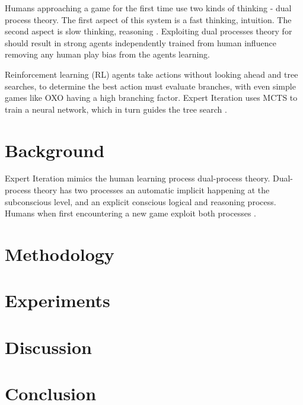 \documentclass[conference]{IEEEtran}
\begin{document}
Humans approaching a game for the first time use two kinds of thinking - dual process theory. The first aspect of this system is a fast thinking, intuition. The second aspect is slow thinking, reasoning \cite{ExpertIteration}. Exploiting dual processes theory for should result in strong agents independently trained from human influence removing any human play bias from the agents learning.

Reinforcement learning (RL) agents take actions without looking ahead and tree searches, to determine the best action must evaluate branches, with even simple games like OXO having a high branching factor. Expert Iteration uses MCTS to train a neural network, which in turn guides the tree search \cite{ExpertIteration}.  

\section{Background}
Expert Iteration mimics the human learning process dual-process theory. Dual-process theory has two processes an automatic implicit happening at the subconscious level, and an explicit conscious logical and reasoning process. Humans when first encountering a new game exploit both processes \cite{dualprocess}.       


\section{Methodology}

\section{Experiments}

\section{Discussion}

\section{Conclusion}



\end{document}
